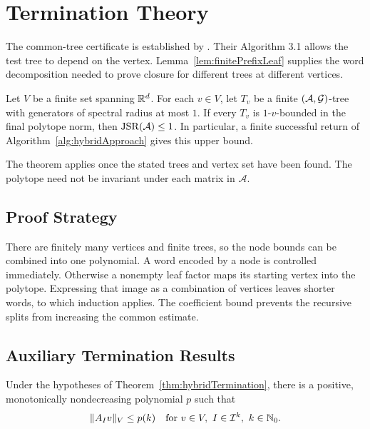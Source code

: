 \section{Termination Theory}
\label{sec:hybridTerminationResults}

The common-tree certificate is established by \citet[Theorem 2.7]{MejstrikReif2025HybridApproachJSR}.
Their Algorithm 3.1 allows the test tree to depend on the vertex.
Lemma~\ref{lem:finitePrefixLeaf} supplies the word decomposition needed to prove closure for different trees at different vertices.

\begin{theorem}
    \label{thm:hybridTermination}
    Let $V$ be a finite set spanning $\mathbb{R}^d$.
    For each $v\in V$, let $T_v$ be a finite $(\mathcal{A},\mathcal{G})$-tree with generators of spectral radius at most $1$.
    If every $T_v$ is $1$-$v$-bounded in the final polytope norm, then $\operatorname{JSR}(\mathcal{A})\leq1$.
    In particular, a finite successful return of Algorithm~\ref{alg:hybridApproach} gives this upper bound.
\end{theorem}

The theorem applies once the stated trees and vertex set have been found.
The polytope need not be invariant under each matrix in $\mathcal{A}$.

\subsection{Proof Strategy}
\label{subsec:hybridProofOutline}

There are finitely many vertices and finite trees, so the node bounds can be combined into one polynomial.
A word encoded by a node is controlled immediately.
Otherwise a nonempty leaf factor maps its starting vertex into the polytope.
Expressing that image as a combination of vertices leaves shorter words, to which induction applies.
The coefficient bound prevents the recursive splits from increasing the common estimate.

\subsection{Auxiliary Termination Results}

\begin{lemma}
    \label{lem:hybridArbitraryProductBound}
    Under the hypotheses of Theorem~\ref{thm:hybridTermination}, there is a positive, monotonically nondecreasing polynomial $p$ such that
    \[
        \lVert A_Iv\rVert_V\leq p(k)
        \quad\text{for }v\in V,\ I\in\mathcal{I}^k,\ k\in\N_0.
    \]
\end{lemma}

